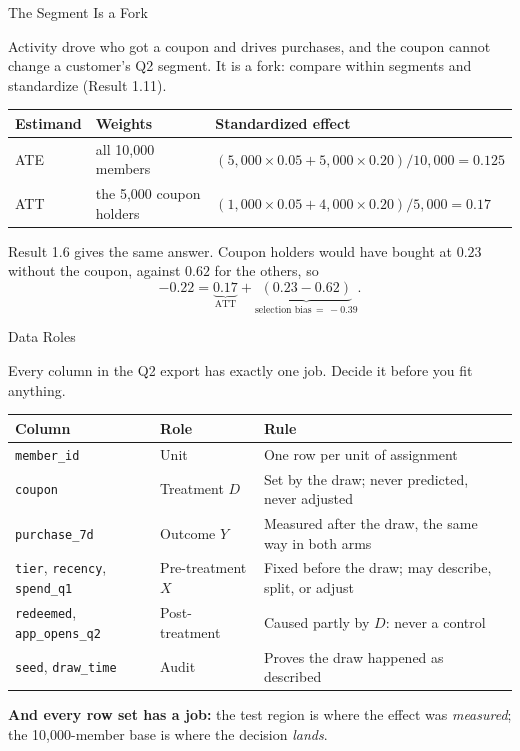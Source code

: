 \documentclass[aspectratio=169, 11pt, handout]{beamer}
\newcommand{\ATT}{\text{ATT}}
\begin{document}
\begin{frame}{The Segment Is a Fork}

Activity drove who got a coupon and drives purchases, and the coupon cannot change a customer's Q2 segment. It is a fork: compare within segments and standardize (Result 1.11).

\bigskip

\begin{center}
\begin{tabular}{lll}
\toprule
\textbf{Estimand} & \textbf{Weights} & \textbf{Standardized effect} \\
\midrule
ATE & all 10{,}000 members & $(5{,}000 \times 0.05 + 5{,}000 \times 0.20)/10{,}000 = 0.125$ \\
ATT & the 5{,}000 coupon holders & $(1{,}000 \times 0.05 + 4{,}000 \times 0.20)/5{,}000 = 0.17$ \\
\bottomrule
\end{tabular}
\end{center}

\bigskip

Result 1.6 gives the same answer. Coupon holders would have bought at $0.23$ without the coupon, against $0.62$ for the others, so
\[
-0.22 = \underbrace{0.17}_{\ATT} + \underbrace{(0.23 - 0.62)}_{\text{selection bias} \,=\, -0.39} .
\]
\end{frame}

\begin{frame}{Data Roles}

Every column in the Q2 export has exactly one job. Decide it before you fit anything.

\begin{center}
\small
\begin{tabular}{llp{6.3cm}}
\toprule
\textbf{Column} & \textbf{Role} & \textbf{Rule} \\
\midrule
\texttt{member\_id} & Unit & One row per unit of assignment \\
\texttt{coupon} & Treatment $D$ & Set by the draw; never predicted, never adjusted \\
\texttt{purchase\_7d} & Outcome $Y$ & Measured after the draw, the same way in both arms \\
\texttt{tier}, \texttt{recency}, \texttt{spend\_q1} & Pre-treatment $X$ & Fixed before the draw; may describe, split, or adjust \\
\texttt{redeemed}, \texttt{app\_opens\_q2} & Post-treatment & Caused partly by $D$: never a control \\
\texttt{seed}, \texttt{draw\_time} & Audit & Proves the draw happened as described \\
\bottomrule
\end{tabular}
\end{center}

\textbf{And every row set has a job:} the test region is where the effect was \emph{measured}; the 10{,}000-member base is where the decision \emph{lands}.
\end{frame}
\end{document}
